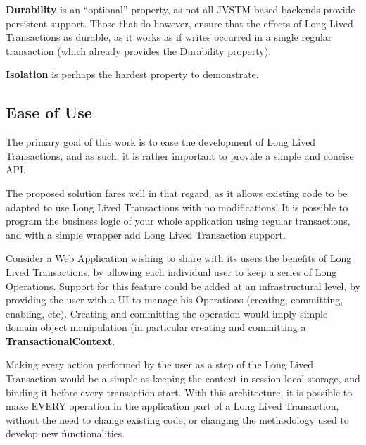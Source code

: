 {\bf Durability} is an ``optional'' property, as not all JVSTM-based
backends provide persistent support. Those that do however, ensure
that the effects of Long Lived Transactions as durable, as it works as
if writes occurred in a single regular transaction (which already
provides the Durability property).

{\bf Isolation} is perhaps the hardest property to demonstrate.



\subsection{Ease of Use}

The primary goal of this work is to ease the development of Long Lived
Transactions, and as such, it is rather important to provide a simple
and concise API.

The proposed solution fares well in that regard, as it allows existing
code to be adapted to use Long Lived Transactions with no
modifications! It is possible to program the business logic of your
whole application using regular transactions, and with a simple
wrapper add Long Lived Transaction support.

Consider a Web Application wishing to share with its users the
benefits of Long Lived Transactions, by allowing each individual user
to keep a series of Long Operations. Support for this feature could be
added at an infrastructural level, by providing the user with a UI to
manage his Operations (creating, committing, enabling, etc). Creating
and committing the operation would imply simple domain object
manipulation (in particular creating and committing a {\bf
  TransactionalContext}.

Making every action performed by the user as a step of the Long Lived
Transaction would be a simple as keeping the context in session-local
storage, and binding it before every transaction start. With this
architecture, it is possible to make EVERY operation in the
application part of a Long Lived Transaction, without the need to
change existing code, or changing the methodology used to develop new
functionalities. 
